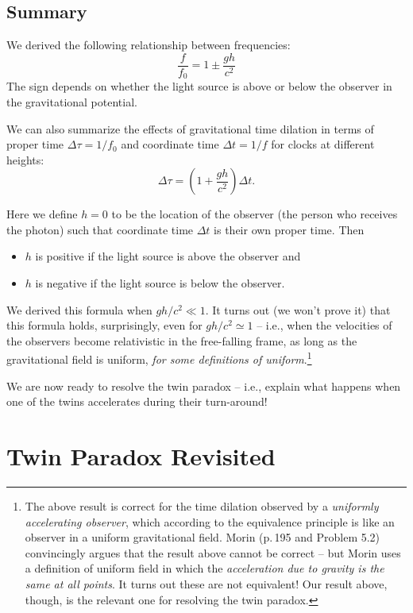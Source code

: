 \documentclass[11pt, letterpaper, openany]{book}
\begin{document}
\subsection*{Summary}

We derived the following relationship between frequencies:
\[ \frac{f}{f_0} = 1 \pm \frac{gh}{c^2} \]
The sign depends on whether the light source is above or below the observer in the gravitational potential.

We can also summarize the effects of gravitational time dilation in terms of proper time $\Delta\tau = 1/f_0$ and coordinate time $\Delta t = 1/f$ for clocks at different heights:
\[ \Delta\tau = \left(1 + \frac{gh}{c^2}\right)\Delta t. \]

Here we define $h = 0$ to be the location of the observer (the person who receives the photon) such that coordinate time $\Delta t$ is their own proper time. Then
\begin{itemize}
    \item $h$ is positive if the light source is above the observer and
    \item $h$ is negative if the light source is below the observer.
\end{itemize}

We derived this formula when $gh/c^2 \ll 1$. It turns out (we won't prove it) that this formula holds, surprisingly, even for $gh/c^2 \simeq 1$ -- i.e., when the velocities of the observers become relativistic in the free-falling frame, as long as the gravitational field is uniform, \textit{for some definitions of uniform}.\footnote{The above result is correct for the time dilation observed by a \textit{uniformly accelerating observer}, which according to the equivalence principle is like an observer in a uniform gravitational field. Morin (p.\,195 and Problem 5.2) convincingly argues that the result above cannot be correct -- but Morin uses a definition of uniform field in which the \textit{acceleration due to gravity is the same at all points}. It turns out these are not equivalent! Our result above, though, is the relevant one for resolving the twin paradox.}

We are now ready to resolve the twin paradox -- i.e., explain what happens when one of the twins accelerates during their turn-around!

\section*{Twin Paradox Revisited}
\end{document}
